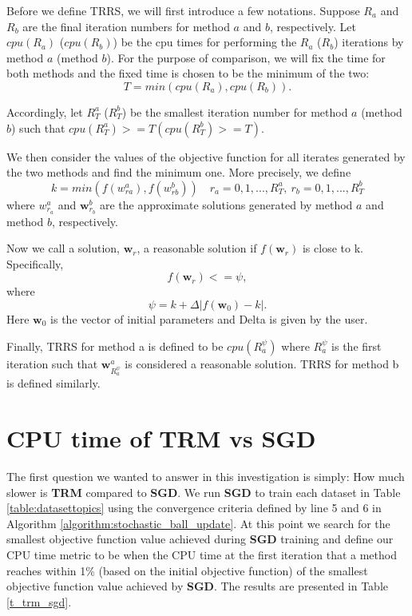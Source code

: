 \documentclass[letterpaper,12pt,titlepage,oneside,final]{book}
\begin{document}
	Before we define TRRS, we will first introduce a few notations. Suppose $R_{a}$ and $R_{b}$ are the final iteration numbers for method $a$ and $b$, respectively. Let $cpu(R_{a})$ ($cpu(R_{b})$) be the cpu times for performing the $R_{a}$ ($R_{b}$) iterations by method $a$ (method $b$). For the purpose of comparison, we will fix the time for both methods and the fixed time is chosen to be the minimum of the two:
	\begin{equation}
	T = min(cpu(R_{a}), cpu(R_{b})).
	\end{equation}
	
	Accordingly, let $R_{T}^{a}$ ($R_{T}^{b}$) be the smallest iteration number for method $a$ (method $b$) such that $cpu(R_{T}^{a}) >= T (cpu(R_{T}^{b}) >= T)$.
	
	We then consider the values of the objective function for all iterates generated by the two methods and find the minimum one. More precisely, we define
	\begin{equation}
	k = min(f(w_{ra}^a), f(w_{rb}^b))       \quad r_{a} = 0, 1, ..., R_{T}^{a}, \  r_{b} = 0, 1, ..., R_{T}^{b}
	\end{equation}
	where $w_{r_{a}}^{a}$ and $\mathbf{w}_{r_{b}}^{b}$ are the approximate solutions generated by method $a$ and method $b$, respectively.
	
	Now we call a solution, $\mathbf{w}_{r}$, a reasonable solution if $f(\mathbf{w}_{r})$ is close to k. Specifically,
	\begin{equation}
	f(\mathbf{w}_{r}) <= \psi,
	\end{equation}
	where
	\begin{equation}
	\psi = k + \Delta |f(\mathbf{w}_0) - k|.
	\end{equation}	
	Here $\mathbf{w}_{0}$ is the vector of initial parameters and Delta is given by the user.
	
	Finally, TRRS for method a is defined to be $cpu(R_{a}^{\psi})$ where $R_{a}^{\psi}$ is the first iteration such that $\mathbf{w}_{R_{a}^{\psi}}^a$ is considered a reasonable solution. TRRS for method b is defined similarly.
		
	\section{CPU time of TRM vs SGD}
	
	The first question we wanted to answer in this investigation is simply: How much slower is \textbf{TRM} compared to \textbf{SGD}. We run \textbf{SGD} to train each dataset in Table \ref{table:datasettopics} using the convergence criteria defined by line 5 and 6 in Algorithm \ref{algorithm:stochastic_ball_update}. At this point we search for the smallest objective function value achieved during \textbf{SGD} training and define our CPU time metric to be when the CPU time at the first iteration that a method reaches within 1\% (based on the initial objective function) of the smallest objective function value achieved by \textbf{SGD}. The results are presented in Table \ref{t_trm_sgd}. 
	
\end{document}
